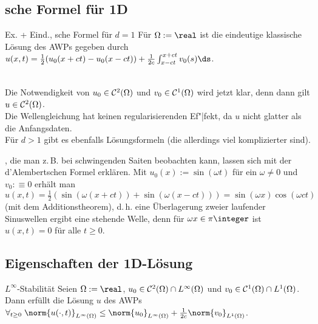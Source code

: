 \pagebreak

\subsection{%
    sche Formel für 1D%
}

\begin{Satz}{Ex. + Eind., sche Formel für $d = 1$}
    Für $\Omega := \real$ ist die eindeutige klassische Lösung des AWPs gegeben durch
    $u(x, t) = \frac{1}{2} (u_0(x+ct) - u_0(x-ct)) + \frac{1}{2c} \int_{x-ct}^{x+ct} v_0(s) \ds$.
\end{Satz}

\begin{Bem}\\
    Die Notwendigkeit von $u_0 \in \mathcal{C}^2(\Omega)$ und $v_0 \in \mathcal{C}^1(\Omega)$ wird jetzt klar,
    denn dann gilt $u \in \mathcal{C}^2(\Omega)$.\\
    Die Wellengleichung hat keinen regularisierenden Ef"|fekt, da $u$ nicht glatter
    als die Anfangsdaten.\\
    Für $d > 1$ gibt es ebenfalls Lösungsformeln (die allerdings viel komplizierter sind).
\end{Bem}

\begin{Bem}
    , die man z.\,B. bei schwingenden Saiten beobachten kann,
    lassen sich mit der d'Alembertschen Formel erklären.
    Mit $u_0(x) := \sin(\omega t)$ für ein $\omega \not= 0$ und $v_0 :\equiv 0$
    erhält man $u(x, t) = \frac{1}{2} (\sin(\omega(x+ct)) + \sin(\omega(x-ct)))
    = \sin(\omega x) \cos(\omega ct)$ (mit dem Additionstheorem),
    d.\,h. eine Überlagerung zweier laufender Sinuswellen ergibt eine stehende Welle,
    denn für $\omega x \in \pi\integer$ ist $u(x, t) = 0$ für alle $t \ge 0$.
\end{Bem}

\subsection{%
    Eigenschaften der 1D-Lösung%
}

\begin{Satz}{$L^\infty$-Stabilität}
    Seien $\Omega := \real$, $u_0 \in \mathcal{C}^2(\Omega) \cap L^\infty(\Omega)$ und
    $v_0 \in \mathcal{C}^1(\Omega) \cap L^1(\Omega)$.\\
    Dann erfüllt die Lösung $u$ des AWPs
    $\forall_{t \ge 0}\; \norm{u(\cdot, t)}_{L^\infty(\Omega)} \le \norm{u_0}_{L^\infty(\Omega)} +
    \frac{1}{2c} \norm{v_0}_{L^1(\Omega)}$.
\end{Satz}

